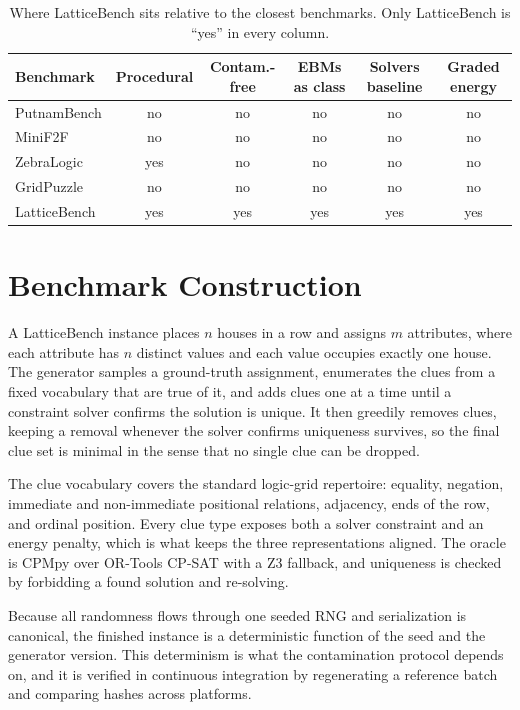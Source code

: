 \documentclass[11pt]{article}
\begin{document}
\begin{table}[t]
\centering
\begin{tabular}{lccccc}
\toprule
Benchmark & Procedural & Contam.-free & EBMs as class & Solvers baseline & Graded energy \\
\midrule
PutnamBench  & no  & no  & no  & no  & no  \\
MiniF2F      & no  & no  & no  & no  & no  \\
ZebraLogic   & yes & no  & no  & no  & no  \\
GridPuzzle   & no  & no  & no  & no  & no  \\
LatticeBench & yes & yes & yes & yes & yes \\
\bottomrule
\end{tabular}
\caption{Where LatticeBench sits relative to the closest benchmarks. Only
LatticeBench is ``yes'' in every column.}
\label{tab:diff}
\end{table}

\section{Benchmark Construction}

A LatticeBench instance places $n$ houses in a row and assigns $m$ attributes,
where each attribute has $n$ distinct values and each value occupies exactly one
house. The generator samples a ground-truth assignment, enumerates the clues from
a fixed vocabulary that are true of it, and adds clues one at a time until a
constraint solver confirms the solution is unique. It then greedily removes clues,
keeping a removal whenever the solver confirms uniqueness survives, so the final
clue set is minimal in the sense that no single clue can be dropped.

The clue vocabulary covers the standard logic-grid repertoire: equality,
negation, immediate and non-immediate positional relations, adjacency, ends of the
row, and ordinal position. Every clue type exposes both a solver constraint and an
energy penalty, which is what keeps the three representations aligned. The oracle
is CPMpy over OR-Tools CP-SAT with a Z3 fallback, and uniqueness is checked by
forbidding a found solution and re-solving.

Because all randomness flows through one seeded RNG and serialization is
canonical, the finished instance is a deterministic function of the seed and the
generator version. This determinism is what the contamination protocol depends on,
and it is verified in continuous integration by regenerating a reference batch and
comparing hashes across platforms.
\end{document}
